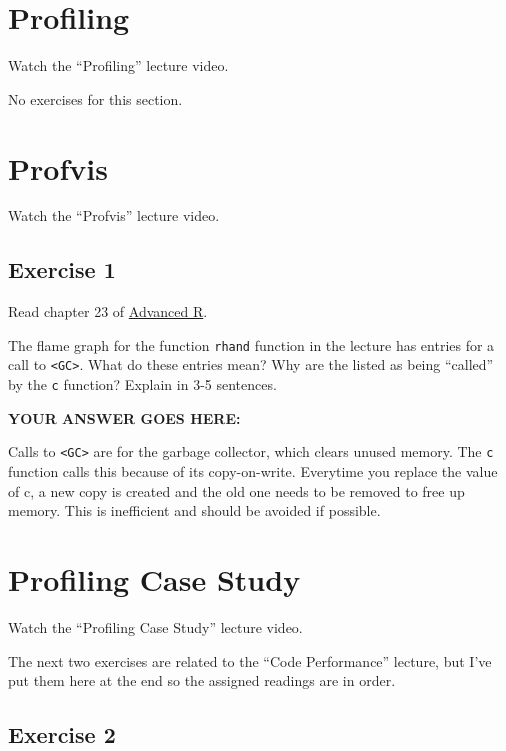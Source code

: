 \documentclass[
]{article}
\begin{document}
\hypertarget{profiling}{%
\section{Profiling}\label{profiling}}

Watch the ``Profiling'' lecture video.

No exercises for this section.

\hypertarget{profvis}{%
\section{Profvis}\label{profvis}}

Watch the ``Profvis'' lecture video.

\hypertarget{exercise-1}{%
\subsection{Exercise 1}\label{exercise-1}}

Read chapter 23 of \href{https://adv-r.hadley.nz}{Advanced R}.

The flame graph for the function \texttt{rhand} function in the lecture
has entries for a call to \texttt{\textless{}GC\textgreater{}}. What do
these entries mean? Why are the listed as being ``called'' by the
\texttt{c} function? Explain in 3-5 sentences.

\textbf{YOUR ANSWER GOES HERE:}

Calls to \texttt{\textless{}GC\textgreater{}} are for the garbage
collector, which clears unused memory. The \texttt{c} function calls
this because of its copy-on-write. Everytime you replace the value of c,
a new copy is created and the old one needs to be removed to free up
memory. This is inefficient and should be avoided if possible.

\hypertarget{profiling-case-study}{%
\section{Profiling Case Study}\label{profiling-case-study}}

Watch the ``Profiling Case Study'' lecture video.

The next two exercises are related to the ``Code Performance'' lecture,
but I've put them here at the end so the assigned readings are in order.

\hypertarget{exercise-2}{%
\subsection{Exercise 2}\label{exercise-2}}
\end{document}
